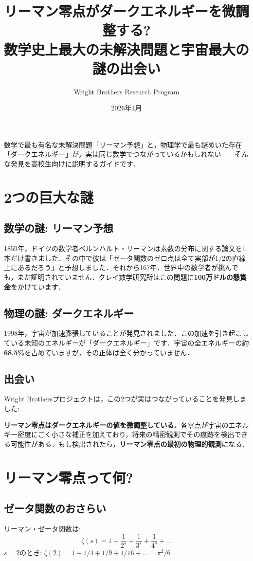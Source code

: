 \documentclass[11pt,a4paper]{article}
\title{リーマン零点がダークエネルギーを微調整する?\\\large 数学史上最大の未解決問題と宇宙最大の謎の出会い}
\author{Wright Brothers Research Program}
\date{2026年4月}
\begin{document}
\maketitle
\begin{tcolorbox}[colback=yellow!5,colframe=orange!60!black,title=このガイドについて]
数学で最も有名な未解決問題「リーマン予想」と，物理学で最も謎めいた存在「ダークエネルギー」が，実は同じ数学でつながっているかもしれない——そんな発見を高校生向けに説明するガイドです．
\end{tcolorbox}
\tableofcontents
\newpage
\section{2つの巨大な謎}
\subsection{数学の謎: リーマン予想}
1859年，ドイツの数学者ベルンハルト・リーマンは素数の分布に関する論文を1本だけ書きました．その中で彼は「ゼータ関数のゼロ点は全て実部が$1/2$の直線上にあるだろう」と予想しました．それから167年．世界中の数学者が挑んでも，まだ証明されていません．クレイ数学研究所はこの問題に\textbf{100万ドルの懸賞金}をかけています．
\subsection{物理の謎: ダークエネルギー}
1998年，宇宙が加速膨張していることが発見されました．この加速を引き起こしている未知のエネルギーが「ダークエネルギー」です．宇宙の全エネルギーの約\textbf{68.5\%}を占めていますが，その正体は全く分かっていません．
\subsection{出会い}
Wright Brothersプロジェクトは，この2つが実はつながっていることを発見しました:
\begin{tcolorbox}[colback=green!5,colframe=green!60!black,title=中心発見]
\textbf{リーマン零点はダークエネルギーの値を微調整している．}各零点が宇宙のエネルギー密度にごく小さな補正を加えており，将来の精密観測でその痕跡を検出できる可能性がある．もし検出されたら，\textbf{リーマン零点の最初の物理的観測}になる．
\end{tcolorbox}

\section{リーマン零点って何?}
\subsection{ゼータ関数のおさらい}
リーマン・ゼータ関数は:
$$\zeta(s) = 1 + \frac{1}{2^s} + \frac{1}{3^s} + \frac{1}{4^s} + \ldots$$
$s=2$のとき: $\zeta(2) = 1 + 1/4 + 1/9 + 1/16 + \ldots = \pi^2/6$
\end{document}
